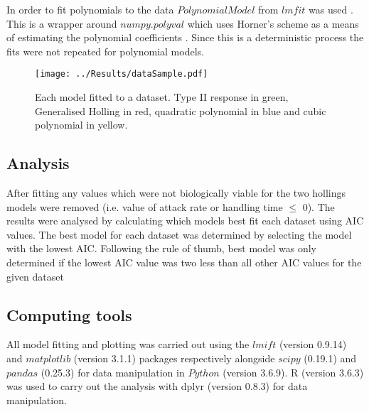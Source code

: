 \documentclass[a4paper]{article}
\numberwithin{equation}{section}
\begin{document}
\newline
In order to fit polynomials to the data $PolynomialModel$ from $lmfit$ was used \citep{newville_matthew_2014_11813}.  This is a wrapper around $numpy.polyval$ which uses Horner’s scheme as a means of estimating the polynomial coefficients \citep{2020SciPy-NMeth}.  Since this is a deterministic process the fits were not repeated for polynomial models.
\begin{figure}[!h]
	\begin{center}
		\texttt{[image: ../Results/dataSample.pdf]}
	\end{center}
	\label{dataSample}
	\caption{Each model fitted to a dataset. Type II response in green, Generalised Holling in red, quadratic polynomial in blue and cubic polynomial in yellow.}
\end{figure}




\subsection{Analysis}
After fitting any values which were not biologically viable for the two hollings models were removed (i.e. value of attack rate or handling time $\leq$ 0).
The results were analysed by calculating which models best fit each dataset using AIC values.  The best model for each dataset was determined by selecting the model with the lowest AIC.  Following the rule of thumb, best model was only determined if the lowest AIC value was two less than all other AIC values for the given dataset \citep{Burnham2004, Johnson2004}


\subsection{Computing tools}
All model fitting and plotting was carried out using the $lmift$ (version 0.9.14) \citep{newville_matthew_2014_11813} and $matplotlib$ (version 3.1.1) \citep{Hunter:2007} packages respectively  alongside $scipy$ (0.19.1) \citep{2020SciPy-NMeth} and $pandas$ (0.25.3) \citep{jeff_reback_2020_3630805} for data manipulation in $Python$ (version 3.6.9).  
\newline
R (version 3.6.3) \citep{R} was used to carry out the analysis with dplyr (version 0.8.3) \citep{dplyr} for data manipulation. 






\newpage
\end{document}
